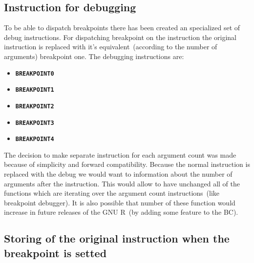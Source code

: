 \documentclass[thesis=M,english]{FITthesis}[2018/10/20]
\newcommand{\code}[1]{\texttt{#1}}
\begin{document}
\subsection{Instruction for debugging}\label{instruction-for-debugging}

To be able to dispatch breakpoints there has been created an specialized set of debug instructions. For dispatching breakpoint on the instruction the original instruction is replaced with it's equivalent~(according to the number of arguments) breakpoint one. The debugging instructions are:

\begin{itemize}
	\item \textbf{\code{BREAKPOINT0}}
	\item \textbf{\code{BREAKPOINT1}}
	\item \textbf{\code{BREAKPOINT2}}
	\item \textbf{\code{BREAKPOINT3}}
	\item \textbf{\code{BREAKPOINT4}}
\end{itemize}

The decision to make separate instruction for each argument count was made because of simplicity and forward compatibility. Because the normal instruction is replaced with the debug we would want to information about the number of arguments after the instruction. This would allow to have unchanged all of the functions which are iterating over the argument count instructions~(like breakpoint debugger). It is also possible that number of these function would increase in future releases of the GNU R~(by adding some feature to the BC).


\subsection{Storing of the original instruction when the breakpoint is setted}\label{storing-original-instructions}
\end{document}
